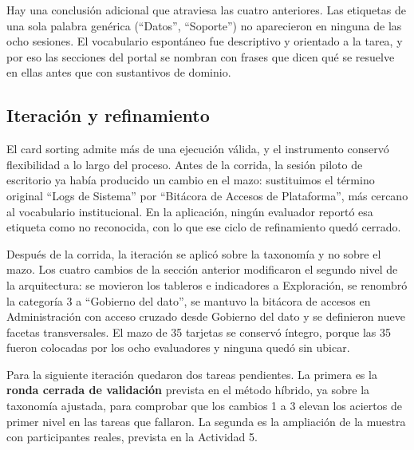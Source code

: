 Hay una conclusión adicional que atraviesa las cuatro anteriores. Las etiquetas de una sola palabra genérica (``Datos'', ``Soporte'') no aparecieron en ninguna de las ocho sesiones. El vocabulario espontáneo fue descriptivo y orientado a la tarea, y por eso las secciones del portal se nombran con frases que dicen qué se resuelve en ellas antes que con sustantivos de dominio.

\subsection{Iteración y refinamiento}
El card sorting admite más de una ejecución válida, y el instrumento conservó flexibilidad a lo largo del proceso. Antes de la corrida, la sesión piloto de escritorio ya había producido un cambio en el mazo: sustituimos el término original ``Logs de Sistema'' por ``Bitácora de Accesos de Plataforma'', más cercano al vocabulario institucional. En la aplicación, ningún evaluador reportó esa etiqueta como no reconocida, con lo que ese ciclo de refinamiento quedó cerrado.

Después de la corrida, la iteración se aplicó sobre la taxonomía y no sobre el mazo. Los cuatro cambios de la sección anterior modificaron el segundo nivel de la arquitectura: se movieron los tableros e indicadores a Exploración, se renombró la categoría 3 a ``Gobierno del dato'', se mantuvo la bitácora de accesos en Administración con acceso cruzado desde Gobierno del dato y se definieron nueve facetas transversales. El mazo de 35 tarjetas se conservó íntegro, porque las 35 fueron colocadas por los ocho evaluadores y ninguna quedó sin ubicar.

Para la siguiente iteración quedaron dos tareas pendientes. La primera es la \textbf{ronda cerrada de validación} prevista en el método híbrido, ya sobre la taxonomía ajustada, para comprobar que los cambios 1 a 3 elevan los aciertos de primer nivel en las tareas que fallaron. La segunda es la ampliación de la muestra con participantes reales, prevista en la Actividad 5.


